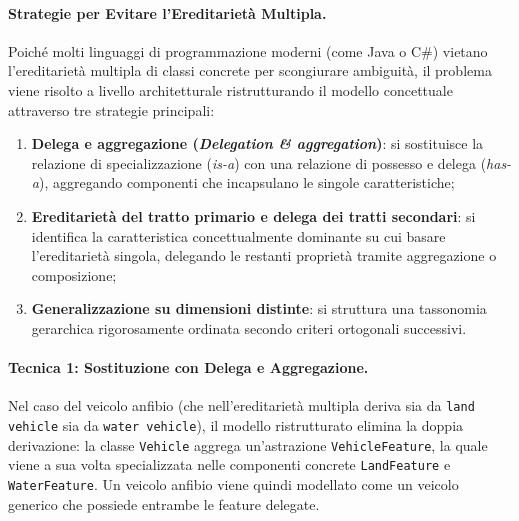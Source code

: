 \documentclass[12pt]{extarticle}
\begin{document}
\paragraph{Strategie per Evitare l'Ereditariet\`a Multipla.}
Poich\'e molti linguaggi di programmazione moderni (come Java o C\#) vietano l'ereditariet\`a multipla di classi concrete per scongiurare ambiguit\`a, il problema viene risolto a livello architetturale ristrutturando il modello concettuale attraverso tre strategie principali:
\begin{enumerate}
    \item \textbf{Delega e aggregazione (\textit{Delegation \& aggregation})}: si sostituisce la relazione di specializzazione (\textit{is-a}) con una relazione di possesso e delega (\textit{has-a}), aggregando componenti che incapsulano le singole caratteristiche;
    \item \textbf{Ereditariet\`a del tratto primario e delega dei tratti secondari}: si identifica la caratteristica concettualmente dominante su cui basare l'ereditariet\`a singola, delegando le restanti propriet\`a tramite aggregazione o composizione;
    \item \textbf{Generalizzazione su dimensioni distinte}: si struttura una tassonomia gerarchica rigorosamente ordinata secondo criteri ortogonali successivi.
\end{enumerate}

\paragraph{Tecnica 1: Sostituzione con Delega e Aggregazione.}
Nel caso del veicolo anfibio (che nell'ereditariet\`a multipla deriva sia da \texttt{land vehicle} sia da \texttt{water vehicle}), il modello ristrutturato elimina la doppia derivazione: la classe \texttt{Vehicle} aggrega un'astrazione \texttt{VehicleFeature}, la quale viene a sua volta specializzata nelle componenti concrete \texttt{LandFeature} e \texttt{WaterFeature}. Un veicolo anfibio viene quindi modellato come un veicolo generico che possiede entrambe le feature delegate.
\end{document}

